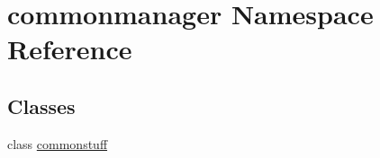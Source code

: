\hypertarget{namespacecommonmanager}{}\section{commonmanager Namespace Reference}
\label{namespacecommonmanager}
\subsection*{Classes}
\begin{DoxyCompactItemize}
\item 
class \hyperlink{classcommonmanager_1_1commonstuff}{commonstuff}
\end{DoxyCompactItemize}
